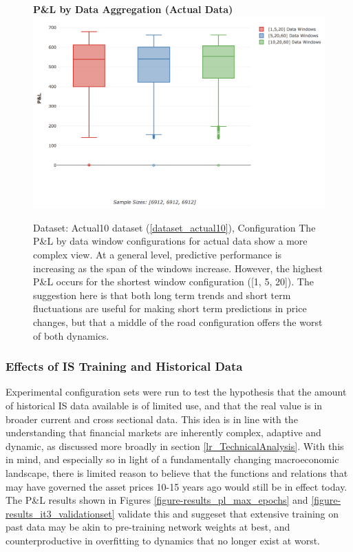 \documentclass[a4paper,11pt,oneside]{article}
\theoremstyle{plain}
\theoremstyle{definition}
\begin{document}
\begin{figure}[H]
	\centering 
	\textbf{P\&L by Data Aggregation (Actual Data) }
	\includegraphics[scale=0.4]{images/results/data/actual_aggregation_pl.png}
	\caption{
		Dataset: Actual10 dataset (\ref{dataset_actual10}), Configuration 
		\newline The P\&L by data window configurations for actual data show a more complex view. At a general level, predictive performance is increasing as the span of the windows increase. However, the highest P\&L occurs for the shortest window configuration ([1, 5, 20]). The suggestion here is that both long term trends and short term fluctuations are useful for making short term predictions in price changes, but that a middle of the road configuration offers the worst of both dynamics.}
	\label{figure-actual_aggregation_pl}
\end{figure}

\subsubsection{Effects of IS Training and Historical Data}\label{results_data_hist}

Experimental configuration sets were run to test the hypothesis that the amount of historical IS data available is of limited use, and that the real value is in broader current and cross sectional data. This idea is in line with the understanding that financial markets are inherently complex, adaptive and dynamic, as discussed more broadly in section \ref{lr_TechnicalAnalysis}. With this in mind, and especially so in light of a fundamentally changing macroeconomic landscape, there is limited reason to believe that the functions and relations that may have governed the asset prices 10-15 years ago would still be in effect today. The P\&L results shown in Figures \ref{figure-results_pl_max_epochs} and \ref{figure-results_it3_validationset} validate this and suggeset that extensive training on past data may be akin to pre-training network weights at best, and counterproductive in overfitting to dynamics that no longer exist at worst.
\end{document}
